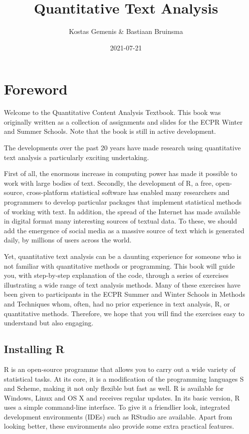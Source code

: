 \documentclass[
]{book}
\title{Quantitative Text Analysis}
\author{Kostas Gemenis \& Bastiaan Bruinsma}
\date{2021-07-21}
\begin{document}
\maketitle

{
\setcounter{tocdepth}{1}
\tableofcontents
}
\hypertarget{foreword}{%
\chapter{Foreword}\label{foreword}}

Welcome to the Quantitative Content Analysis Textbook. This book was originally written as a collection of assignments and slides for the ECPR Winter and Summer Schools. Note that the book is still in active development.

The developments over the past 20 years have made research using quantitative text analysis a particularly exciting undertaking.

First of all, the enormous increase in computing power has made it possible to work with large bodies of text. Secondly, the development of R, a free, open-source, cross-platform statistical software has enabled many researchers and programmers to develop particular packages that implement statistical methods of working with text. In addition, the spread of the Internet has made available in digital format many interesting sources of textual data. To these, we should add the emergence of social media as a massive source of text which is generated daily, by millions of users across the world.

Yet, quantitative text analysis can be a daunting experience for someone who is not familiar with quantitative methods or programming. This book will guide you, with step-by-step explanation of the code, through a series of exercises illustrating a wide range of text analysis methods. Many of these exercises have been given to participants in the ECPR Summer and Winter Schools in Methods and Techniques whom, often, had no prior experience in text analysis, R, or quantitative methods. Therefore, we hope that you will find the exercises easy to understand but also engaging.

\hypertarget{installing-r}{%
\section{Installing R}\label{installing-r}}

R is an open-source programme that allows you to carry out a wide variety of statistical tasks. At its core, it is a modification of the programming languages S and Scheme, making it not only flexible but fast as well. R is available for Windows, Linux and OS X and receives regular updates. In its basic version, R uses a simple command-line interface. To give it a friendlier look, integrated development environments (IDEs) such as RStudio are available. Apart from looking better, these environments also provide some extra practical features.
\end{document}
